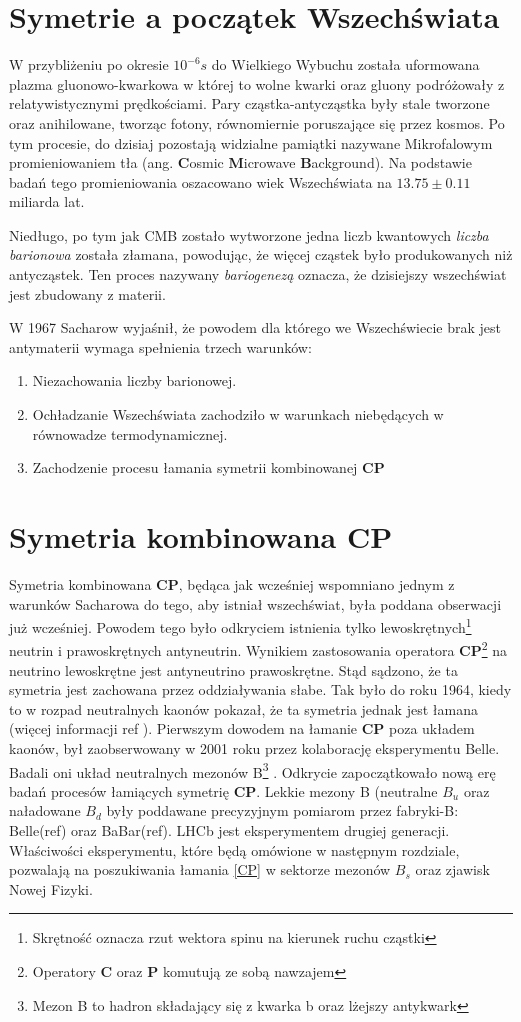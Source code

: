 \section{Symetrie a początek Wszechświata}
W przybliżeniu po okresie $10^{-6}s$ do Wielkiego Wybuchu została uformowana plazma gluonowo-kwarkowa w której to wolne kwarki oraz gluony podróżowały z relatywistycznymi prędkościami. Pary cząstka-antycząstka były stale tworzone oraz anihilowane, tworząc fotony, równomiernie poruszające się przez kosmos. Po tym procesie, do dzisiaj pozostają widzialne pamiątki nazywane Mikrofalowym promieniowaniem tła (ang. \textbf{C}osmic \textbf{M}icrowave \textbf{B}ackground). Na podstawie badań tego promieniowania oszacowano wiek Wszechświata na $13.75 \pm 0.11$ miliarda lat.

Niedługo, po tym jak CMB zostało wytworzone jedna liczb kwantowych \textit{liczba barionowa} została złamana, powodując, że więcej cząstek było produkowanych niż antycząstek. Ten proces nazywany \textit{bariogenezą} oznacza, że dzisiejszy wszechświat jest zbudowany z materii.

W 1967 Sacharow  wyjaśnił, że powodem dla którego we Wszechświecie brak jest antymaterii wymaga spełnienia trzech warunków:
\begin{enumerate}
\item Niezachowania liczby barionowej. 
\item Ochładzanie Wszechświata zachodziło w warunkach niebędących w równowadze termodynamicznej. 
\item Zachodzenie procesu łamania symetrii kombinowanej \textbf{CP} 
\end{enumerate}

\section{Symetria kombinowana \textbf{CP}}
Symetria kombinowana \textbf{CP}, będąca jak wcześniej wspomniano jednym z warunków Sacharowa do tego, aby istniał wszechświat, była poddana obserwacji już wcześniej. Powodem tego było odkryciem istnienia tylko lewoskrętnych\footnote{Skrętność oznacza rzut wektora spinu na kierunek ruchu cząstki} neutrin i prawoskrętnych antyneutrin. Wynikiem zastosowania operatora \textbf{CP}\footnote{Operatory \textbf{C} oraz \textbf{P} komutują ze sobą nawzajem} na neutrino lewoskrętne jest antyneutrino prawoskrętne. Stąd sądzono, że ta symetria jest zachowana przez oddziaływania słabe. Tak było do roku 1964, kiedy to w rozpad neutralnych kaonów pokazał, że ta symetria jednak jest łamana (więcej informacji ref ). Pierwszym dowodem na łamanie  \textbf{CP} poza układem kaonów, był zaobserwowany w 2001 roku przez kolaborację eksperymentu Belle. Badali oni układ neutralnych mezonów B\footnote{Mezon B to hadron składający się z kwarka b oraz lżejszy antykwark } . Odkrycie zapoczątkowało nową erę badań procesów łamiących symetrię  \textbf{CP}. Lekkie mezony B (neutralne $B_u$ oraz naładowane $B_d$ były poddawane precyzyjnym pomiarom przez fabryki-B: Belle(ref) oraz BaBar(ref). LHCb jest eksperymentem drugiej generacji. Właściwości eksperymentu, które będą omówione w następnym rozdziale, pozwalają na poszukiwania łamania \ref{CP}  w sektorze mezonów $B_{s}$ oraz zjawisk Nowej Fizyki.
